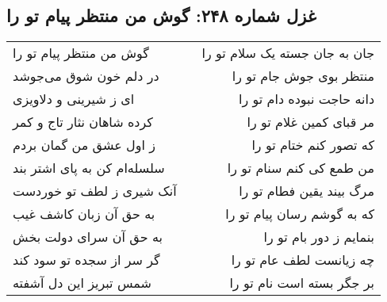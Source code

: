 \begin{center}
\section*{غزل شماره ۲۴۸: گوش من منتظر پیام تو را}
\label{sec:0248}
\begin{longtable}{l p{0.5cm} r}
گوش من منتظر پیام تو را
&&
جان به جان جسته یک سلام تو را
\\
در دلم خون شوق می‌جوشد
&&
منتظر بوی جوش جام تو را
\\
ای ز شیرینی و دلاویزی
&&
دانه حاجت نبوده دام تو را
\\
کرده شاهان نثار تاج و کمر
&&
مر قبای کمین غلام تو را
\\
ز اول عشق من گمان بردم
&&
که تصور کنم ختام تو را
\\
سلسله‌ام کن به پای اشتر بند
&&
من طمع کی کنم سنام تو را
\\
آنک شیری ز لطف تو خوردست
&&
مرگ بیند یقین فطام تو را
\\
به حق آن زبان کاشف غیب
&&
که به گوشم رسان پیام تو را
\\
به حق آن سرای دولت بخش
&&
بنمایم ز دور بام تو را
\\
گر سر از سجده تو سود کند
&&
چه زیانست لطف عام تو را
\\
شمس تبریز این دل آشفته
&&
بر جگر بسته است نام تو را
\\
\end{longtable}
\end{center}
